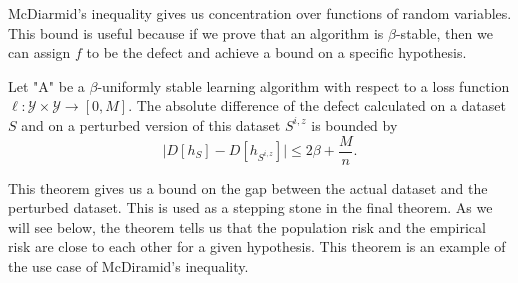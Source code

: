 \documentclass{article}
\begin{document}
McDiarmid's inequality gives us concentration over functions of random variables. This bound is useful because if we prove that an algorithm is $\beta$-stable, then we can assign $f$ to be the defect and achieve a bound on a specific hypothesis.

\begin{thm}\label{def_bound} Let "A" be a $\beta$-uniformly stable learning algorithm with respect to a loss function $\ell: \mathcal{Y} \times \mathcal{Y} \rightarrow [0, M]$. The absolute difference of the defect calculated on a dataset $S$ and on a perturbed version of this dataset $S^{i, z}$ is bounded by
\[
\biggl|D[h_S] - D[h_{S^{i,z}}]\biggr| \leq 2\beta + \frac{M}{n}.
\]
\end{thm}
This theorem gives us a bound on the gap between the actual dataset and the perturbed dataset. This is used as a stepping stone in the final theorem. As we will see below, the theorem tells us that the population risk and the empirical risk are close to each other for a given hypothesis. This theorem is an example of the use case of McDiramid's inequality.
\end{document}
